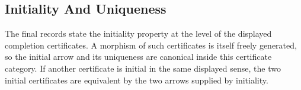 \documentclass[11pt]{article}
\begin{document}
\subsection{Initiality And Uniqueness}

The final records state the initiality property at the level of the
displayed completion certificates.  A morphism of such certificates is
itself freely generated, so the initial arrow and its uniqueness are
canonical inside this certificate category.  If another certificate is
initial in the same displayed sense, the two initial certificates are
equivalent by the two arrows supplied by initiality.

\begin{code}%
\>[0]\<%
\\
\>[0]\<%
\\
\>[0]\AgdaSpace{}%
\AgdaSpace{}%
\AgdaSymbol{:}\AgdaSpace{}%
\AgdaSpace{}%
\<%
\\
\>[0][@{}l@{\AgdaIndent{0}}]%
\>[2]\<%
\\
\>[2][@{}l@{\AgdaIndent{0}}]%
\>[4]%
\>[27]\AgdaSymbol{:}\AgdaSpace{}%
\<%
\\
%
\>[4]%
\>[27]\AgdaSymbol{:}\AgdaSpace{}%
\AgdaSpace{}%
\AgdaSymbol{(}\AgdaSpace{}%
\AgdaSymbol{)}\<%
\\
%
\>[4]%
\>[27]\AgdaSymbol{:}\AgdaSpace{}%
\AgdaSpace{}%
\AgdaSymbol{(}\AgdaSpace{}%
\AgdaSymbol{)}\<%
\\
%
\>[4]%
\>[27]\AgdaSymbol{:}\<%
\\
\>[4][@{}l@{\AgdaIndent{0}}]%
\>[6]\<%
\\
\>[6][@{}l@{\AgdaIndent{0}}]%
\>[8]\AgdaSymbol{(}\AgdaSpace{}%
\AgdaSymbol{)}\<%
\\
%
\>[8]\AgdaSymbol{(}\AgdaSpace{}%
\AgdaSymbol{)}\<%
\\
%
\>[4]%
\>[27]\AgdaSymbol{:}\<%
\\
\>[4][@{}l@{\AgdaIndent{0}}]%

\end{code}
\end{document}
